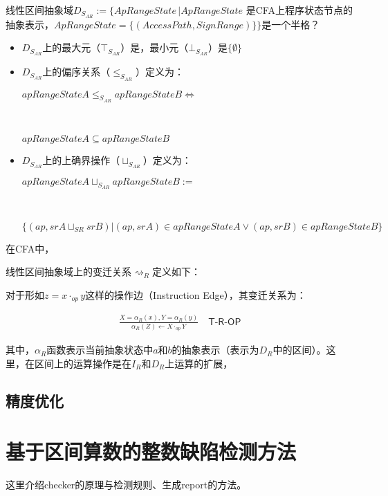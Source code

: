 \begin{definition}
	线性区间抽象域$ D_{S_{AR}}  := \{ApRangeState \, | ApRangeState$ 是CFA上程序状态节点的抽象表示，$ ApRangeState =  \{(AccessPath, SignRange)\}   \}  $是一个{\color{red}半格？}
	\begin{itemize}
		\item $ D_{S_{AR}} $上的最大元（$ \top_{S_{AR}} $）是，最小元（$ \bot_{S_{AR}} $）是$ \{\emptyset\} $
		
		\item $ D_{S_{AR}} $上的偏序关系（$ \le_{S_{AR}} $）定义为：\\
		\centerline{$ apRangeStateA \le_{S_{AR}} apRangeStateB \iff $}\\
		\centerline{$ apRangeStateA \subseteq apRangeStateB$ }
		
		\item $ D_{S_{AR}} $上的上确界操作（$ \sqcup_{S_{AR}} $）定义为：\\
		\centerline{$ apRangeStateA \sqcup_{S_{AR}} apRangeStateB := $}\\
		\centerline{$ \{(ap, srA \sqcup_{SR} srB) | (ap, srA) \in apRangeStateA \lor (ap, srB) \in apRangeStateB\} $}
	\end{itemize}
\end{definition}

在CFA中，


线性区间抽象域上的变迁关系$ \rightsquigarrow_R $定义如下：

对于形如$ z = x \cdot_{op}  y$这样的操作边（Instruction Edge），其变迁关系为：

\begin{align}
\frac{X=\alpha_R(x), Y=\alpha_R(y)}{\alpha_R(Z) \leftarrow X \cdot_{op}Y} \quad\textsf{T-R-OP}
\end{align}

其中，$ \alpha_R $函数表示当前抽象状态中$ a $和$ b $的抽象表示（表示为$ D_R $中的区间）。这里，在区间上的运算操作是在$ I_R $和$ D_R $上运算的扩展，

\subsection{精度优化}

\section{基于区间算数的整数缺陷检测方法}

这里介绍checker的原理与检测规则、生成report的方法。

